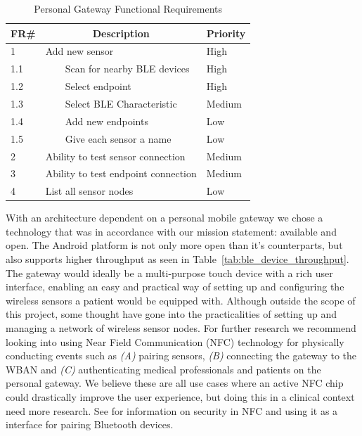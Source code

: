 \begin{table}[]
\centering
\caption{Personal Gateway Functional Requirements}
\label{tab:gatewayRequirements}
\begin{tabular}{|l|l|l|}
\hline
\textbf{FR\#} & \multicolumn{1}{c|}{\textbf{Description}} & \multicolumn{1}{c|}{\textbf{Priority}} \\ \hline
1             & Add new sensor                            & High                                   \\ \hline
1.1           & \ \ \ \ Scan for nearby BLE devices               & High                                   \\ \hline
1.2           & \ \ \ \ Select endpoint                           & High                                   \\ \hline
1.3           & \ \ \ \ Select BLE Characteristic                 & Medium                                 \\ \hline
1.4           & \ \ \ \ Add new endpoints                         & Low                                 \\ \hline
1.5           & \ \ \ \ Give each sensor a name                   & Low                                    \\ \hline
2             & Ability to test sensor connection         & Medium                                 \\ \hline
3             & Ability  to test endpoint connection      & Medium                                 \\ \hline
4             & List all sensor nodes                     & Low                                    \\ \hline
\end{tabular}
\end{table}

With an architecture dependent on a personal mobile gateway we chose a technology that was in accordance with our mission statement: available and open. The Android platform is not only more open than it's counterparts, but also supports higher throughput as seen in Table~\ref{tab:ble_device_throughput}.
The gateway would ideally be a multi-purpose touch device with a rich user interface, enabling an easy and practical way of setting up and configuring the wireless sensors a patient would be equipped with. Although outside the scope of this project, some thought have gone into the practicalities of setting up and managing a network of wireless sensor nodes. For further research we recommend looking into using Near Field Communication (NFC) technology for physically conducting events such as \emph{(A)} pairing sensors, \emph{(B)} connecting the gateway to the WBAN and \emph{(C)} authenticating medical professionals and patients on the personal gateway. We believe these are all use cases where an active NFC chip could drastically improve the user experience, but doing this in a clinical context need more research. See \cite{atp:2006ue} for information on security in NFC and using it as a interface for pairing Bluetooth devices.



